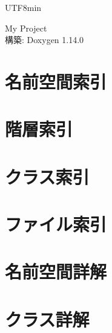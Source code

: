 \documentclass[twoside]{book}
\newcommand{\+}{\discretionary{\mbox{\scriptsize$\hookleftarrow$}}{}{}}
\newcommand{\clearemptydoublepage}{%
    \newpage{\pagestyle{empty}\cleardoublepage}%
  }
\begin{document}
  \raggedbottom
  \begin{CJK}{UTF8}{min}
    \hypersetup{pageanchor=false,
                bookmarksnumbered=true,
                pdfencoding=unicode
               }
  \begin{titlepage}
  \vspace*{7cm}
  \begin{center}%
  {\Large My Project}\\
  \vspace*{1cm}
  {\large 構築\+: Doxygen 1.14.0}\\
  \end{center}
  \end{titlepage}
  \clearemptydoublepage
  \tableofcontents
  \clearemptydoublepage
  \hypersetup{pageanchor=true}
\chapter{名前空間索引}

\chapter{階層索引}

\chapter{クラス索引}

\chapter{ファイル索引}

\chapter{名前空間詳解}







\chapter{クラス詳解}



















\end{CJK}
\end{document}
